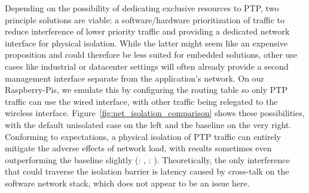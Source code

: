 Depending on the possibility of dedicating exclusive resources to PTP, two principle solutions are viable: a software/hardware prioritization of traffic to reduce interference of lower priority traffic and providing a dedicated network interface for physical isolation. While the latter might seem like an expensive proposition and could therefore be less suited for embedded solutions, other use cases like industrial or datacenter settings will often already provide a second management interface separate from the application's network. On our Raspberry-Pis, we emulate this by configuring the routing table so only PTP traffic can use the wired interface, with other traffic being relegated to the wireless interface. Figure~\ref{fig:net_isolation_comparison} shows these possibilities, with the default unisolated case on the left and the baseline on the very right.%
%
{}%
%
Conforming to expectations, a physical isolation of PTP traffic can entirely mitigate the adverse effects of network load, with results sometimes even outperforming the baseline slightly (\fVendor{\cmpMinArg}: \fRelative{\cmpMin}, \fVendor{\cmpMaxArg}: \fRelative{\cmpMax}).
Theoretically, the only interference that could traverse the isolation barrier is latency caused by cross-talk on the software network stack, which does not appear to be an issue here.

